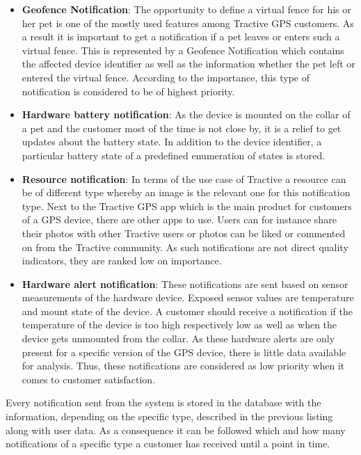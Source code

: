 \begin{itemize}
	\item \textbf{Geofence Notification}: The opportunity to define a virtual fence for his or her pet is one of the mostly used features among Tractive GPS customers. As a result it is important to get a notification if a pet leaves or enters such a virtual fence. This is represented by a Geofence Notification which contains the affected device identifier as well as the information whether the pet left or entered the virtual fence. According to the importance, this type of notification is considered to be of highest priority. 
	\item \textbf{Hardware battery notification}: As the device is mounted on the collar of a pet and the customer most of the time is not close by, it is a relief to get updates about the battery state. In addition to the device identifier, a particular battery state of a predefined enumeration of states is stored.
	\item \textbf{Resource notification}: In terms of the use case of Tractive a resource can be of different type whereby an image is the relevant one for this notification type. Next to the Tractive GPS app which is the main product for customers of a GPS device, there are other apps to use. Users can for instance share their photos with other Tractive users or photos can be liked or commented on from the Tractive community. As such notifications are not direct quality indicators, they are ranked low on importance.
	\item \textbf{Hardware alert notification}: These notifications are sent based on sensor measurements of the hardware device. Exposed sensor values are temperature and mount state of the device. A customer should receive a notification if the temperature of the device is too high respectively low as well as when the device gets unmounted from the collar. As these hardware alerts are only present for a specific version of the GPS device, there is little data available for analysis. Thus, these notifications are considered as low priority when it comes to customer satisfaction.
\end{itemize}

Every notification sent from the system is stored in the database with the information, depending on the specific type, described in the previous listing along with user data. As a consequence it can be followed which and how many notifications of a specific type a customer has received until a point in time. 

